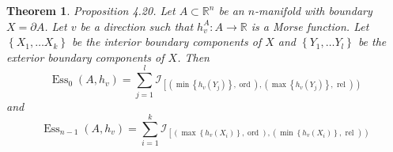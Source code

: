 \documentclass[a4paper]{article}
\theoremstyle{theorem}
\newtheorem{theorem}{Theorem}[section]
\theoremstyle{definition}
\theoremstyle{remark}
\theoremstyle{gremark}
\theoremstyle{discussion}
\theoremstyle{notation}
\begin{document}
	\begin{theorem}
		Proposition 4.20. Let $A \subset \mathbb{R}^n$ be an $n$-manifold with boundary $X=\partial A$. Let $v$ be a direction such that $h_v^A: A \rightarrow \mathbb{R}$ is a Morse function. Let $\left\{X_1, \ldots X_k\right\}$ be the interior boundary components of $X$ and $\left\{Y_1, \ldots Y_l\right\}$ be the exterior boundary components of $X$. Then
		$$
		\operatorname{Ess}_0\left(A, h_v\right)=\sum_{j=1}^l \mathcal{I}_{\left[\left(\min \left\{h_v\left(Y_j\right)\right\}, \operatorname{ord}\right),\left(\max \left\{h_v\left(Y_j\right)\right\}, \text { rel }\right)\right)}
		$$
		and
		$$
		\operatorname{Ess}_{n-1}\left(A, h_v\right)=\sum_{i=1}^k \mathcal{I}_{\left[\left(\max \left\{h_v\left(X_i\right)\right\}, \operatorname{ord}\right),\left(\min \left\{h_v\left(X_i\right)\right\}, \text { rel }\right)\right)}
		$$
	\end{theorem}
	
\end{document}
